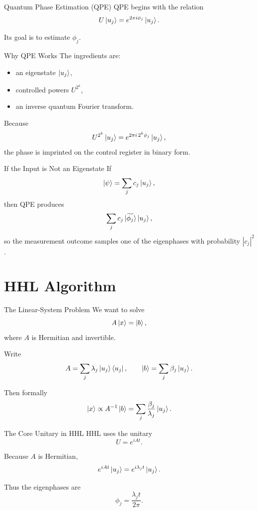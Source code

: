 \documentclass{beamer}
\begin{document}
\begin{frame}{Quantum Phase Estimation (QPE)}
QPE begins with the relation
\[
U\ket{u_j}=e^{2\pi i\phi_j}\ket{u_j}.
\]

Its goal is to estimate \(\phi_j\).
\end{frame}

\begin{frame}{Why QPE Works}
The ingredients are:
\begin{itemize}
\item an eigenstate \(\ket{u_j}\),
\item controlled powers \(U^{2^k}\),
\item an inverse quantum Fourier transform.
\end{itemize}

Because
\[
U^{2^k}\ket{u_j}=e^{2\pi i\, 2^k\phi_j}\ket{u_j},
\]
the phase is imprinted on the control register in binary form.
\end{frame}

\begin{frame}{If the Input is Not an Eigenstate}
If
\[
\ket{\psi}=\sum_j c_j \ket{u_j},
\]
then QPE produces
\[
\sum_j c_j \ket{\widetilde{\phi_j}}\ket{u_j},
\]
so the measurement outcome samples one of the eigenphases with probability \(|c_j|^2\).
\end{frame}

\section{HHL Algorithm}

\begin{frame}{The Linear-System Problem}
We want to solve
\[
A\ket{x}=\ket{b},
\]
where \(A\) is Hermitian and invertible.

Write
\[
A=\sum_j \lambda_j \ket{u_j}\bra{u_j},
\qquad
\ket{b}=\sum_j \beta_j \ket{u_j}.
\]

Then formally
\[
\ket{x}\propto A^{-1}\ket{b}
=\sum_j \frac{\beta_j}{\lambda_j}\ket{u_j}.
\]
\end{frame}

\begin{frame}{The Core Unitary in HHL}
HHL uses the unitary
\[
U=e^{iAt}.
\]

Because \(A\) is Hermitian,
\[
e^{iAt}\ket{u_j}=e^{i\lambda_j t}\ket{u_j}.
\]

Thus the eigenphases are
\[
\phi_j=\frac{\lambda_j t}{2\pi}.
\]
\end{frame}
\end{document}
